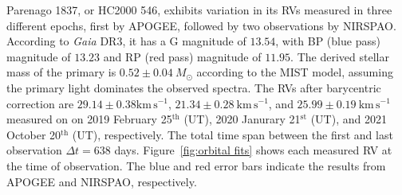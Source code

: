 \documentclass[12pt]{ucsddissertation}
\begin{document}
\begin{CJK*}{UTF8}{gbsn}
Parenago 1837, or HC2000 546, exhibits variation in its RVs measured in three different epochs, first by APOGEE, followed by two observations by NIRSPAO. According to \textit{Gaia} DR3, it has a G magnitude of $13.54$, with BP (blue pass) magnitude of $13.23$ and RP (red pass) magnitude of $11.95$. The derived stellar mass of the primary is $0.52\pm0.04~M_\odot$ according to the MIST model, assuming the primary light dominates the observed spectra. The RVs after barycentric correction are $29.14\pm0.38\mathrm{km}\,\mathrm{s^{-1}}$, $21.34\pm0.28~\mathrm{km}\,\mathrm{s^{-1}}$, and $25.99\pm0.19~\mathrm{km}\,\mathrm{s^{-1}}$ measured on on 2019 February 25$^\mathrm{th}$ (UT), 2020 Janurary 21$^\mathrm{st}$ (UT), and 2021 October 20$^\mathrm{th}$ (UT), respectively. The total time span between the first and last observation $\Delta t=638$ days. Figure~\ref{fig:orbital fits} shows each measured RV at the time of observation. The blue and red error bars indicate the results from APOGEE and NIRSPAO, respectively.


\end{CJK*}
\end{document}
